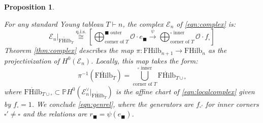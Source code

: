 \documentclass[12pt]{amsart}
\numberwithin{equation}{section}
\newtheorem{proposition}[theorem]{Proposition}
\theoremstyle{definition}
\theoremstyle{remark}
\newcommand{\PP}{\mathbb{P}}
\newcommand{\CE}{\mathcal{E}}
\newcommand{\CO}{\mathcal{O}}
\renewcommand{\1}{\mathbf{1}}
\newcommand{\FH}{\mathrm{FHilb}}
\newcommand{\oFH}{\mathring{\FH}}
\newcommand{\qis}{\mathrm{q.i.s.}}
\newcommand{\sq}{\square}
\newcommand{\bsq}{\blacksquare}
\begin{document}
\begin{proposition}
\label{prop:chart} 

For any standard Young tableau $T \vdash n$, the complex $\CE_n$ of \eqref{eqn:complex} is:
\begin{equation}
\label{eqn:localcomplex}
\CE_n|_{\oFH_T} \stackrel{\qis}\cong \left[\bigoplus^{\bsq \text{ outer}}_{\text{corner of }T} \CO \cdot e_\bsq \stackrel{\psi}\longrightarrow \bigoplus^{\sq \text{ inner}}_{\text{corner of }T} \CO \cdot f_\sq \right]
\end{equation}
Theorem \ref{thm:complex} describes the map $\pi: \FH_{n+1} \rightarrow \FH_n$ as the projectivization of $H^0(\CE_n)$. Locally, this map takes the form:
$$
\pi^{-1}\left(\oFH_T \right) = \bigcup^{\sq \text{ inner}}_{\text{corner of }T} \oFH_{T \cup \sq}
$$
where $\oFH_{T \cup \sq} \subset \PP H^0\left( \CE^{\vee}_n|_{\oFH_T} \right)$ is the affine chart of \eqref{eqn:localcomplex} given by $f_\sq = 1$. We conclude \eqref{eqn:genrel}, where the generators are $f_{\sq'}$ for inner corners $\sq'\neq \sq$ and the relations are $r_{\bsq} = \psi(e_\bsq)$.

\end{proposition}
\end{document}
